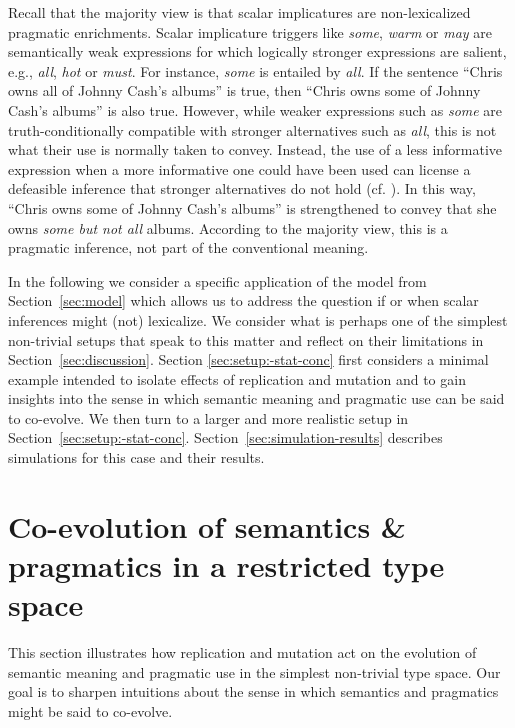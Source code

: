 \documentclass[a4paper, 11pt]{article}
\theoremstyle{Satz}
\begin{document}
Recall that the majority view is that scalar implicatures are non-lexicalized pragmatic
enrichments. Scalar implicature triggers like \emph{some}, \emph{warm} or \emph{may} are
semantically weak expressions for which logically stronger expressions are salient, e.g.,
\emph{all}, \emph{hot} or \emph{must}. For instance, {\em some} is entailed by {\em all}. If
the sentence ``Chris owns all of Johnny Cash's albums'' is true, then ``Chris owns some of
Johnny Cash's albums'' is also true. However, while weaker expressions such as {\em some} are
truth-conditionally compatible with stronger alternatives such as {\em all}, this is not what
their use is normally taken to convey. Instead, the use of a less informative expression when a
more informative one could have been used can license a defeasible inference that stronger
alternatives do not hold (cf. \citealt{horn:1972,gazdar:1979}). In this way, ``Chris owns some
of Johnny Cash's albums'' is strengthened to convey that she owns {\em some but not all}
albums. According to the majority view, this is a pragmatic inference, not part of the
conventional meaning.

In the following we consider a specific application of the model from Section~\ref{sec:model}
which allows us to address the question if or when scalar inferences might (not) lexicalize. We
consider what is perhaps one of the simplest non-trivial setups that speak to this matter and
reflect on their limitations in Section~\ref{sec:discussion}. Section
\ref{sec:setup:-stat-conc} first considers a minimal example intended to isolate effects of
replication and mutation and to gain insights into the sense in which semantic meaning and
pragmatic use can be said to co-evolve. We then turn to a larger and more realistic setup in
Section~\ref{sec:setup:-stat-conc}. Section~\ref{sec:simulation-results} describes simulations
for this case and their results.


\section{Co-evolution of semantics \& pragmatics in a restricted type space}
\label{subsec:example}

This section illustrates how replication and mutation act on the evolution of semantic meaning
and pragmatic use in the simplest non-trivial type space. Our goal is to sharpen intuitions
about the sense in which semantics and pragmatics might be said to co-evolve.
\end{document}
